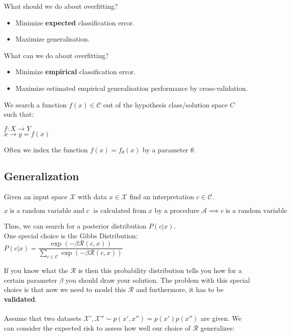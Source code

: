 \documentclass[twoside]{article}
\begin{document}
What should we do about overfitting?
\begin{itemize}
    \item Minimize \textbf{expected} classification error.
    \item Maximize generalisation.
\end{itemize}

What can we do about overfitting?
\begin{itemize}
    \item Minimize \textbf{empirical} classification error.
    \item Maximize estimated empirical generalisation performance by cross-validation.
\end{itemize}

We search a function $f(x) \in \mathcal{C}$ out of the hypothesis class/solution space $C$ such that:
\begin{center}
$f : X \rightarrow Y$\\
$x \rightarrow y = f(x)$
\end{center}
Often we index the function $f(x) = f_\theta(x)$ by a parameter $\theta$.\\


\subsection{Generalization}
Given an input space $\mathcal{X}$ with data $x \in \mathcal{X}$ find an interpretation $c \in \mathcal{C}$.

$$x \;\text{is a random variable and} \; c \; \text{ is calculated from} \; x \text{ by a procedure}\; \mathcal{A} \implies c \; \text{is a random variable}$$

Thus, we can search for a posterior distribution $P(c|x)$.\\
One special choice is the Gibbs Distribution: $P(c | x) = \dfrac{\exp{(-\beta \mathcal{R}(c, x))}}{\sum_{c \in \mathcal{C}}\exp{(-\beta \mathcal{R}(c, x))}} $ 

If you know what the $\mathcal{R}$ is then this probability distribution tells you how for a certain parameter $\beta$ you should draw your solution. The problem with this special choice is that now we need to model this $\mathcal{R}$ and furthermore, it has to be  \textbf{validated}.\\\\
Assume that two datasets $\mathcal{X}',\mathcal{X}''  \sim p(x',x'') = p(x')p(x'')$ are given. We can consider the expected risk to assess how well our choice of $\mathcal{R}$ generalizes:
\end{document}

